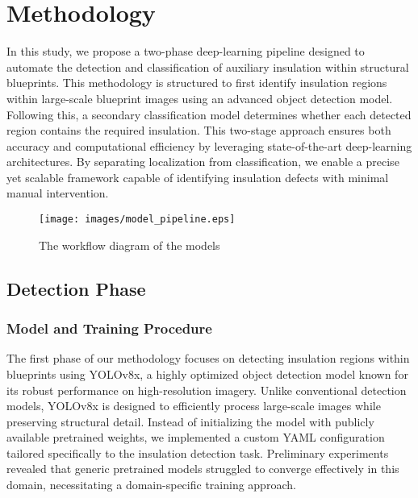 \documentclass[]{IEEEphot}
\begin{document}
\section{Methodology}
\hspace*{1em}In this study, we propose a two-phase deep-learning pipeline designed to automate the detection and classification of auxiliary insulation within structural blueprints. This methodology is structured to first identify insulation regions within large-scale blueprint images using an advanced object detection model. Following this, a secondary classification model determines whether each detected region contains the required insulation. This two-stage approach ensures both accuracy and computational efficiency by leveraging state-of-the-art deep-learning architectures. By separating localization from classification, we enable a precise yet scalable framework capable of identifying insulation defects with minimal manual intervention.


\begin{figure}[h]
    \centering
    \texttt{[image: images/model\_pipeline.eps]}
    \caption{The workflow diagram of the models}
    \label{fig:enter-label}
\end{figure}
\subsection{Detection Phase}
\subsubsection{Model and Training Procedure
}
\hspace*{1em}The first phase of our methodology focuses on detecting insulation regions within blueprints using YOLOv8x, a highly optimized object detection model known for its robust performance on high-resolution imagery. Unlike conventional detection models, YOLOv8x is designed to efficiently process large-scale images while preserving structural detail. Instead of initializing the model with publicly available pretrained weights, we implemented a custom YAML configuration tailored specifically to the insulation detection task. Preliminary experiments revealed that generic pretrained models struggled to converge effectively in this domain, necessitating a domain-specific training approach.
\end{document}

